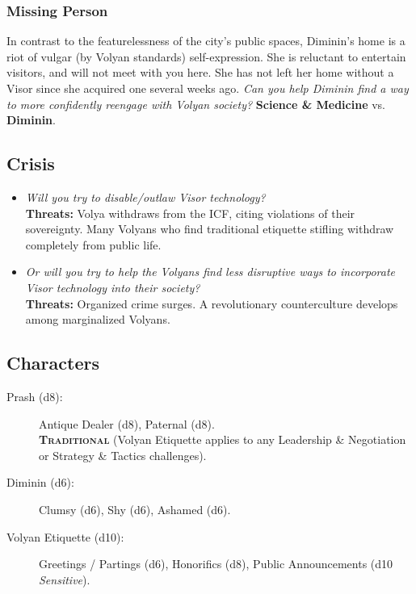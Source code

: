 \documentclass[11pt, a5paper, parskip=half-, DIV=12]{scrartcl}
\begin{document}
\subsubsection*{Missing Person}%
In contrast to the featurelessness of the city's public spaces, Diminin's home is a riot of vulgar (by Volyan standards) self-expression. She is reluctant to entertain visitors, and will not meet with you here. She has not left her home without a Visor since she acquired one several weeks ago. \textit{Can you help Diminin find a way to more confidently reengage with Volyan society?} \textbf{Science \& Medicine} vs. \textbf{Diminin}.

\subsection*{Crisis}

\begin{itemize}
	\item \textit{Will you try to disable/outlaw Visor technology?} \\ \textbf{Threats:} Volya withdraws from the ICF, citing violations of their sovereignty. Many Volyans who find traditional etiquette stifling withdraw completely from public life.
	\item \textit{Or will you try to help the Volyans find less disruptive ways to incorporate Visor technology into their society?} \\ \textbf{Threats:} Organized crime surges. A revolutionary counterculture develops among marginalized Volyans.   
\end{itemize}

\newpage

\subsection*{Characters}
\begin{description}
	\item[Prash (d8):] Antique Dealer (d8), Paternal (d8). \\ \textbf{\textsc{Traditional}} (Volyan Etiquette applies to any Leadership \& Negotiation or Strategy \& Tactics challenges).
	\item[Diminin (d6):] Clumsy (d6), Shy (d6), Ashamed (d6).
	\item[Volyan Etiquette (d10):] Greetings / Partings (d6), Honorifics (d8), Public Announcements (d10 \textit{Sensitive}).
\end{description}
\end{document}

